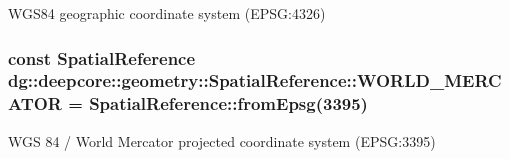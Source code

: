 W\+G\+S84 geographic coordinate system (E\+P\+SG\+:4326) 

\subsubsection[{\texorpdfstring{W\+O\+R\+L\+D\+\_\+\+M\+E\+R\+C\+A\+T\+OR}{WORLD_MERCATOR}}]{\setlength{\rightskip}{0pt plus 5cm}const Spatial\+Reference dg\+::deepcore\+::geometry\+::\+Spatial\+Reference\+::\+W\+O\+R\+L\+D\+\_\+\+M\+E\+R\+C\+A\+T\+OR = Spatial\+Reference\+::from\+Epsg(3395)\hspace{0.3cm}{\ttfamily [static]}}\hypertarget{group___imagery_module_ga07533c6dcdfd100538307ceef2152f24}{}\label{group___imagery_module_ga07533c6dcdfd100538307ceef2152f24}


W\+GS 84 / World Mercator projected coordinate system (E\+P\+SG\+:3395) 

